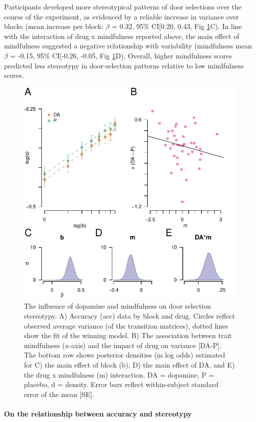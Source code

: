 \documentclass{article}
\begin{document}
Participants developed more stereotypical patterns of door selections
over the course of the experiment, as evidenced by a reliable increase
in variance over blocks (mean increase per block: \(\beta\) = 0.32, 95\%
CI{[}0.20, 0.43, Fig \ref{fig:stereofig}C). In line with the interaction
of drug x mindfulness reported above, the main effect of mindfulness
suggested a negative relationship with variability (mindfulness mean
\(\beta\) = -0.15, 95\% CI{[}-0.26, -0.05, Fig \ref{fig:stereofig}D).
Overall, higher mindfulness scores predicted less stereotypy in
door-selection patterns relative to low mindfulness scores.

\begin{figure}

{\centering \includegraphics[width=0.7\linewidth]{../../images/s_fig} 

}

\caption{The influence of dopamine and mindfulness on door selection stereotypy. A) Accuracy (acc) data by block and drug. Circles reflect observed average variance (of the transition matrices), dotted lines show the fit of the winning model. B) The association between trait mindfulness (x-axis) and the impact of drug on variance [DA-P]. The bottom row shows posterior densities (in log odds) estimated for C) the main effect of block (b), D) the main effect of DA, and E) the drug x mindfulness (m) interaction. DA = dopamine, P = placebo, d = density. Error bars reflect within-subject standard error of the mean [SE].}\label{fig:stereofig}
\end{figure}

\hypertarget{on-the-relationship-between-accuracy-and-stereotypy}{%
\paragraph{On the relationship between accuracy and
stereotypy}\label{on-the-relationship-between-accuracy-and-stereotypy}}
\end{document}
